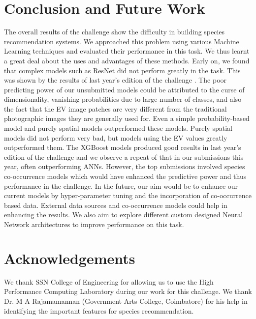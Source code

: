 \documentclass[runningheads]{llncs}
\begin{document}
\section{Conclusion and Future Work}
The overall results of the challenge show the difficulty in building species recommendation systems. We approached this problem using various Machine Learning techniques and evaluated their performance in this task. We thus learnt a great deal about the uses and advantages of these methods. 
\newline
\newline 
\noindent Early on, we found that complex models such as ResNet did not perform greatly in the task. This was shown by the results of last year's edition of the challenge \cite{glc18}. The poor predicting power of our unsubmitted models could be attributed to the curse of dimensionality, vanishing probabilities due to large number of classes, and also the fact that the EV image patches are very different from the traditional photographic images they are generally used for. Even a simple probability-based model and purely spatial models outperformed these models. Purely spatial models did not perform very bad, but models using the EV values greatly outperformed them. The XGBoost models produced good results in last year's edition of the challenge and we observe a repeat of that in our submissions this year, often outperforming ANNs. However, the top submissions involved species co-occurrence models which would have enhanced the predictive power and thus performance in the challenge.
\newline
\newline
\noindent In the future, our aim would be to enhance our current models by hyper-parameter tuning and the incorporation of co-occurrence based data. External data sources and co-occurrence models could help in enhancing the results. We also aim to explore different custom designed Neural Network architectures to improve performance on this task.

\section{Acknowledgements}
We thank SSN College of Engineering for allowing us to use the High Performance Computing Laboratory during our work for this challenge. We thank Dr. M A Rajamamannan (Government Arts College, Coimbatore) for his help in identifying the important features for species recommendation.


\end{document}
